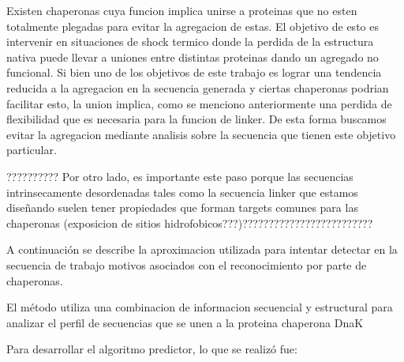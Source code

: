 Existen chaperonas cuya funcion implica unirse a proteinas que no esten totalmente plegadas para evitar la agregacion de estas. El objetivo de esto es intervenir en situaciones de shock termico donde la perdida de la estructura nativa puede llevar a uniones entre distintas proteinas dando un agregado no funcional. Si bien uno de los objetivos de este trabajo es lograr una tendencia reducida a la agregacion en la secuencia generada y ciertas chaperonas podrian facilitar esto, la union implica, como se menciono anteriormente una perdida de flexibilidad que es necesaria para la funcion de linker. De esta forma buscamos evitar la agregacion mediante analisis sobre la secuencia que tienen este objetivo particular.

??????????
Por otro lado, es importante este paso porque las secuencias intrinsecamente desordenadas tales como la secuencia linker que estamos diseñando suelen tener propiedades que forman targets comunes para las chaperonas (exposicion de sitios hidrofobicos???)?????????????????????????


A continuación se describe la aproximacion utilizada para intentar detectar en la secuencia de trabajo motivos asociados con el reconocimiento por parte de chaperonas.

El método utiliza una combinacion de informacion secuencial y estructural para analizar el perfil de secuencias que se unen a la proteina chaperona DnaK

Para desarrollar el algoritmo predictor, lo que se realizó fue:

